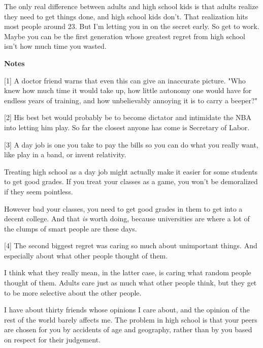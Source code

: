 The
                  only real difference between adults and high school kids is
                  that adults realize they need to get things done, and high
                  school kids don't. That realization hits most people around
                  23. But I'm letting you in on the secret early. So get to
                  work. Maybe you can be the first generation whose greatest
                  regret from high school isn't how much time you wasted.






                  \textbf{Notes}

[1] A doctor friend warns that even
                  this can give an inaccurate picture. "Who knew how much time
                  it would take up, how little autonomy one would have for
                  endless years of training, and how unbelievably annoying it is
                  to carry a beeper?"

[2] His best bet would probably
                  be to become dictator and intimidate the NBA into letting him
                  play. So far the closest anyone has come is Secretary of
                  Labor.

[3] A day job is one you take to pay the
                  bills so you can do what you really want, like play in a band,
                  or invent relativity.

Treating high school as a day
                  job might actually make it easier for some students to get
                  good grades. If you treat your classes as a game, you won't be
                  demoralized if they seem pointless.

However bad
                  your classes, you need to get good grades in them to get into
                  a decent college. And that \emph{is} worth doing, because
                  universities are where a lot of the clumps of smart people are
                  these days.

[4] The second biggest regret was
                  caring so much about unimportant things. And especially about
                  what other people thought of them.

I think what
                  they really mean, in the latter case, is caring what random
                  people thought of them. Adults care just as much what other
                  people think, but they get to be more selective about the
                  other people.

I have about thirty friends whose
                  opinions I care about, and the opinion of the rest of the
                  world barely affects me. The problem in high school is that
                  your peers are chosen for you by accidents of age and
                  geography, rather than by you based on respect for their
                  judgement.

